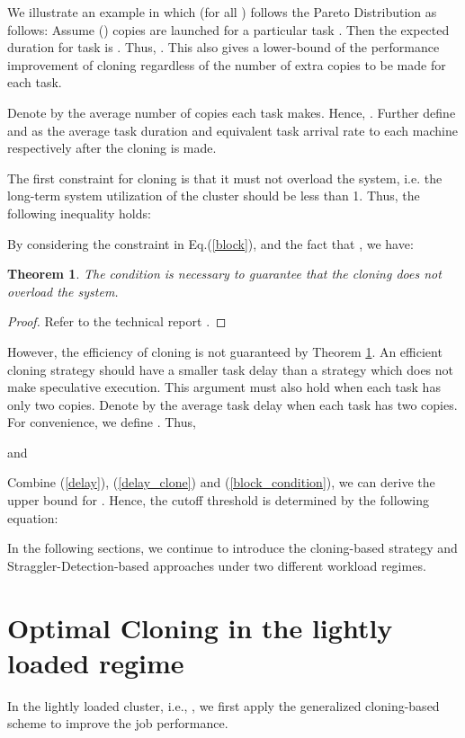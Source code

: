\documentclass[10pt,conference]{IEEEtran}
\newtheorem{Theorem}{Theorem}
\begin{document}
We illustrate an example in which  (for all ) follows the Pareto Distribution as follows: 
Assume  () copies are launched for a particular task . Then the expected duration for task  is
.
Thus, . This also gives a lower-bound of  the performance improvement of cloning regardless of the number of extra copies to be made for each task.

Denote by  the average number of copies each task makes. Hence, . Further define  and  as the average task duration and equivalent task arrival rate to each machine respectively after the cloning is made.

The first constraint for cloning is that it must not overload the system, i.e. the long-term system utilization of the cluster should be less than 1. Thus, the following inequality holds:

 By considering the constraint  in Eq.(\ref{block}), and the fact that , we have:

\begin{Theorem}
The condition  is necessary to guarantee that the cloning does not overload the system.
\label{threshold}
\end{Theorem}
\begin{proof}
Refer to the technical report \cite{speculative-multi-job}.
\end{proof}
However, the efficiency of cloning is not guaranteed by Theorem \ref{threshold}. An efficient cloning strategy should have a smaller task delay than a strategy which does not make speculative execution. This argument must also hold when each task has only two copies. Denote by  the average task delay when each task has two copies. For convenience, we define . Thus,

and

Combine (\ref{delay}), (\ref{delay_clone}) and (\ref{block_condition}), we can derive the upper bound
  for . Hence, the cutoff threshold is determined by the following equation:

In the following sections, we continue to introduce the cloning-based strategy and Straggler-Detection-based approaches under two different workload regimes. 


\section{Optimal Cloning in the lightly loaded regime}
\label{SCA_design}
In the lightly loaded cluster, i.e., , we first apply the generalized cloning-based scheme to improve the job performance.
\end{document}
